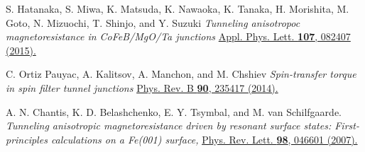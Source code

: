 \documentclass[10pt,pr,twocolumn,showpacs,amssymb,floatfix,superscriptaddress]{revtex4-1}
\begin{document}
\begin{thebibliography}{999}
 S. Hatanaka, S. Miwa, K. Matsuda, K. Nawaoka, K. Tanaka, H. Morishita, M. Goto, N. Mizuochi, T. Shinjo, and Y. Suzuki
\textit{Tunneling anisotropoc magnetoresistance in CoFeB/MgO/Ta junctions}
\href{https://doi.org/10.1063/1.4929682}{Appl. Phys. Lett. {\bf 107}, 082407 (2015).}

 C. Ortiz Pauyac, A. Kalitsov, A. Manchon, and M. Chshiev
\textit{Spin-transfer torque in spin filter tunnel junctions}
\href{https://doi.org/10.1103/PhysRevB.90.235417}{Phys. Rev. B {\bf 90}, 235417 (2014).}

 A. N. Chantis, K. D. Belashchenko, E. Y. Tsymbal, and M. van Schilfgaarde.
\textit{Tunneling anisotropic magnetoresistance driven by resonant surface states: First-principles calculations on a Fe(001) surface,}
\href{https://doi.org/10.1103/PhysRevLett.98.046601}{Phys. Rev. Lett. {\bf 98}, 046601 (2007).}
\end{thebibliography}
\end{document}
